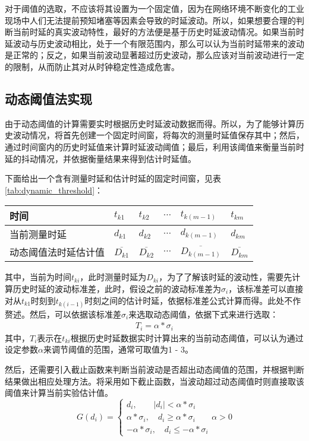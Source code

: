 对于阈值的选取，不应该将其设置为一个固定值，因为在网络环境不断变化的工业现场中人们无法提前预知堵塞等因素会导致的时延波动。所以，如果想要合理的判断当前时延的真实波动特性，最好的方法便是基于历史时延波动情况。如果当前时延波动与历史波动相比，处于一个有限范围内，那么可以认为当前时延带来的波动是正常的；反之，如果当前波动显著超过历史波动，那么应该对当前波动进行一定的限制，从而防止其对从时钟稳定性造成危害。

\subsection{动态阈值法实现}
由于动态阈值的计算需要实时根据历史时延波动数据而得。所以，为了能够计算历史波动情况，将首先创建一个固定时间窗，将每次的测量时延值保存其中；然后，通过时间窗内的历史时延值来计算时延波动阈值；最后，利用该阈值来衡量当前时延的抖动情况，并依据衡量结果来得到估计时延值。

下面给出一个含有测量时延和估计时延的固定时间窗，见表\ref{tab:dynamic_threshold}：
\begin{table}[!hpb]
  \centering
  \begin{tabular}{llllll} \toprule
  	时间 & $t_{k1}$ & $t_{k2}$ & $\cdots$ & $t_{k(m-1)}$ & $t_{km}$ \\ \midrule
    当前测量时延 & $d_{k1}$ & $d_{k2}$ & $\cdots$ & $d_{k(m-1)}$ & $d_{km}$ \\ \midrule
    动态阈值法时延估计值 & $\overline{D_{k1}}$ & $\overline{D_{k2}}$ & $\cdots$ & $\overline{D_{k(m-1)}}$ & $\overline{D_{km}}$  \\ \bottomrule
  \end{tabular}
\end{table}

其中，当前为时间$t_{ki}$，此时测量时延为$D_{ki}$，为了了解该时延的波动性，需要先计算历史时延的波动标准差，此时，假设之前的波动标准差为$\sigma_{i}$，该标准差可以直接对从$t_{k1}$时刻到$t_{k(i-1)}$时刻之间的估计时延，依据标准差公式计算而得。此处不作赘述。然后，可以依据该标准差$\sigma_{i}$来选取动态阈值，依据下式来进行选取：
\begin{align}
T_{i} = \alpha * \sigma_{i}
\end{align}
其中，$T_{i}$表示在$t_{ki}$根据历史时延数据实时计算出来的当前动态阈值，可以认为通过设定参数$\alpha$来调节阈值的范围，通常可取值为1 - 3。

然后，还需要引入截止函数来判断当前波动是否超出动态阈值的范围，并根据判断结果做出相应处理方法。将采用如下截止函数，当波动超过动态阈值时则直接取该阈值来计算当前实验估计值。
\begin{equation}
G(d_{i}) = \left\{
	\begin{array}{lll} %
		d_{i}, \qquad \left | d_{i} \right | < \alpha * \sigma_{i} \\
		\alpha * \sigma_{i}, \quad d_{i} \geq \alpha * \sigma_{i} \\
		-\alpha * \sigma_{i}, \quad d_{i} \leq -\alpha * \sigma_{i}
	\end{array}
	\alpha > 0 \right. 
\end{equation}

